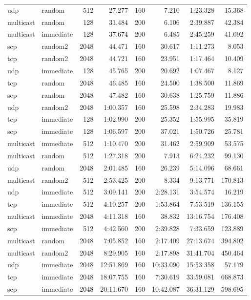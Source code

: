 \begin{tabular}{|l|l|r|r|r|r|r|r|}
udp & random & 512 & 27.277 & 160 & 7.210 & 1:23.328 & 15.368\\
multicast & random & 128 & 31.484 & 200 & 6.106 & 2:39.887 & 42.384\\
multicast & immediate & 128 & 37.674 & 200 & 6.485 & 2:45.259 & 41.092\\
scp & random2 & 2048 & 44.471 & 160 & 30.617 & 1:11.273 & 8.053\\
tcp & random2 & 2048 & 44.721 & 160 & 23.951 & 1:17.464 & 10.409\\
udp & immediate & 128 & 45.765 & 200 & 20.692 & 1:07.467 & 8.127\\
tcp & random & 2048 & 46.485 & 160 & 24.500 & 1:38.500 & 11.869\\
scp & random & 2048 & 47.482 & 160 & 30.638 & 1:25.759 & 11.886\\
udp & random2 & 2048 & 1:00.357 & 160 & 25.598 & 2:34.283 & 19.983\\
tcp & immediate & 128 & 1:02.990 & 200 & 25.352 & 1:55.995 & 35.819\\
scp & immediate & 128 & 1:06.597 & 200 & 37.021 & 1:50.726 & 25.781\\
multicast & immediate & 512 & 1:10.470 & 200 & 31.462 & 2:59.909 & 53.575\\
multicast & random & 512 & 1:27.318 & 200 & 7.913 & 6:24.232 & 99.130\\
udp & random & 2048 & 2:01.485 & 160 & 26.239 & 5:14.096 & 68.661\\
multicast & random2 & 512 & 2:53.425 & 200 & 8.334 & 9:13.771 & 170.813\\
udp & immediate & 512 & 3:09.141 & 200 & 2:28.131 & 3:54.574 & 16.219\\
tcp & immediate & 512 & 4:10.257 & 200 & 1:53.864 & 7:53.519 & 136.155\\
multicast & immediate & 2048 & 4:11.318 & 160 & 38.832 & 13:16.754 & 176.408\\
scp & immediate & 512 & 4:42.560 & 200 & 2:39.828 & 7:33.659 & 123.889\\
multicast & random & 2048 & 7:05.852 & 160 & 2:17.409 & 27:13.674 & 394.802\\
multicast & random2 & 2048 & 8:29.905 & 160 & 2:17.898 & 31:41.704 & 450.464\\
udp & immediate & 2048 & 12:51.869 & 160 & 10:33.090 & 15:53.358 & 57.179\\
tcp & immediate & 2048 & 18:07.755 & 160 & 7:30.619 & 33:59.081 & 668.873\\
scp & immediate & 2048 & 20:11.670 & 160 & 10:42.087 & 36:31.129 & 598.695\\
\hline
\end{tabular}
